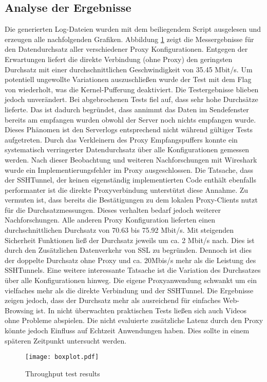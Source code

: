 \documentclass[12pt, a4paper]{scrartcl}
\begin{document}
\subsection{Analyse der Ergebnisse}
Die generierten Log-Dateien wurden mit dem beiliegendem Script ausgelesen und erzeugen alle nachfolgenden Grafiken.
\noindent Abbildung \@\ref{fig::boxres} zeigt die Messergebnisse für den Datendurchsatz aller verschiedener Proxy Konfigurationen. Entgegen der Erwartungen liefert die direkte Verbindung (ohne Proxy) den geringsten Durchsatz mit einer durchschnittlichen Geschwindigkeit von 35.45 Mbit/s.
Um potentiell ungewollte Variationen auszuschließen wurde der Test mit dem  Flag von  wiederholt, was die Kernel-Pufferung deaktiviert. Die Testergebnisse blieben jedoch unverändert.\newline
Bei abgebrochenen Tests fiel auf, dass  sehr hohe Durchsätze lieferte. Das ist dadurch begründet, dass  annimmt das Daten im Sendefenster bereits am empfangen wurden obwohl der Server noch nichts empfangen wurde. Dieses Phänomen ist den Serverlogs entsprechend nicht während gültiger Tests aufgetreten. Durch das Verkleinern des Proxy Empfangspuffers konnte ein systematisch verringerter Datendurchsatz über alle Konfigurationen gemessen werden. Nach dieser Beobachtung und weiteren Nachforschungen mit Wireshark wurde ein Implementierungsfehler im Proxy ausgeschlossen. Die Tatsache, dass der SSHTunnel, der keinen eigenständig implementierten Code enthält ebenfalls performanter ist die direkte Proxyverbindung unterstützt diese Annahme. Zu vermuten ist, dass  bereits die Bestätigungen zu dem lokalen Proxy-Clients nutzt für die Durchsatzmessungen. Dieses verhalten bedarf jedoch weiterer Nachforschungen.\newline
Alle anderen Proxy Konfiguration lieferten einen durchschnittlichen Durchsatz von 70.63 bis 75.92 Mbit/s. Mit steigenden Sicherheit Funktionen ließ der Durchsatz jeweils um ca. 2 Mbit/s nach. Dies ist durch den Zusätzlichen Datenverkehr von \ac{SSL} zu begründen. Dennoch ist dies der doppelte Durchsatz ohne Proxy und ca. 20Mbis/s mehr als die Leistung des SSHTunnels. Eine weitere interessante Tatsache ist die Variation des Durchsatzes über alle Konfigurationen hinweg. Die eigene Proxyanwendung schwankt um ein vielfaches mehr als die direkte Verbindung und der SSHTunnel.\newline
Die Ergebnisse zeigen jedoch, dass der Durchsatz mehr als ausreichend für einfaches Web-Browsing ist. In nicht überwachten praktischen Tests ließen sich auch Videos ohne Probleme abspielen. Die nicht evaluierte zusätzliche Latenz durch den Proxy könnte jedoch Einfluss auf Echtzeit Anwendungen haben. Dies sollte in einem späteren Zeitpunkt untersucht werden.
\begin{figure}[]
    \centering
    \texttt{[image: boxplot.pdf]}
    \caption{Throughput test results}\label{fig::boxres}
\end{figure}
\end{document}

